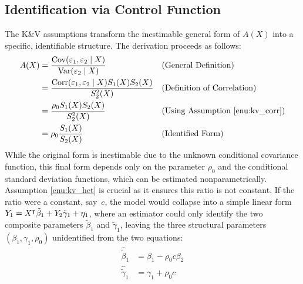 \subsection{Identification via Control Function}
The K\&V assumptions transform the inestimable general form of $A(X)$ into a specific, identifiable structure. The derivation proceeds as follows:
\begin{align*}
A(X) &= \frac{\operatorname{Cov}(\varepsilon_1, \varepsilon_2 \mid X)}{\operatorname{Var}(\varepsilon_2 \mid X)} &&\text{(General Definition)} \\
&= \frac{\operatorname{Corr}(\varepsilon_1, \varepsilon_2 \mid X) S_1(X) S_2(X)}{S_2^2(X)} &&\text{(Definition of Correlation)} \\
&= \frac{\rho_0 S_1(X) S_2(X)}{S_2^2(X)} &&\text{(Using Assumption \ref{enu:kv_corr})} \\
&= \rho_0 \frac{S_1(X)}{S_2(X)} &&\text{(Identified Form)}
\end{align*}
While the original form is inestimable due to the unknown conditional covariance function, this final form depends only on the parameter $\rho_0$ and the conditional standard deviation functions, which can be estimated nonparametrically. Assumption \ref{enu:kv_het} is crucial as it ensures this ratio is not constant. If the ratio were a constant, say~$c$, the model would collapse into a simple linear form \(Y_1 = X^{\intercal}\tilde{\beta}_1 + Y_2\tilde{\gamma}_1 + \eta_1\), where an estimator could only identify the two composite parameters $\tilde{\beta}_1$ and $\tilde{\gamma}_1$, leaving the three structural parameters $(\beta_1, \gamma_1, \rho_0)$ unidentified from the two equations:
\begin{align*}
\hat{\tilde{\beta}}_1 &= \beta_1 - \rho_0 c \beta_2 \\
\hat{\tilde{\gamma}}_1 &= \gamma_1 + \rho_0 c
\end{align*}

